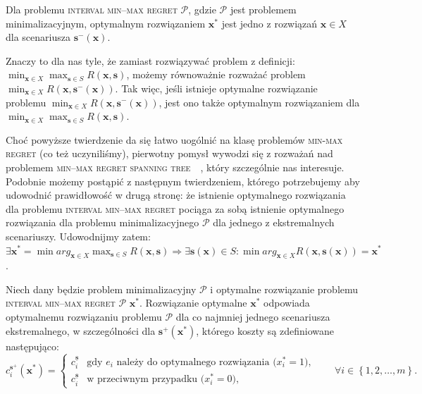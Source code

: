 \begin{corollary}
	Dla problemu \textsc{interval min--max regret $\mathcal{P}$}, gdzie $\mathcal{P}$ jest problemem minimalizacyjnym, optymalnym rozwiązaniem $\textbf{x}^{\ast}$ jest jedno z rozwiązań $\textbf{x} \in X$ dla scenariusza $\textbf{s}^{-} \left( \textbf{x} \right)$.
\end{corollary}

Znaczy to dla nas tyle, że zamiast rozwiązywać problem z definicji: $\min_{\textbf{x} \in X} \max_{\textbf{s} \in S} R \left( \textbf{x}, \textbf{s} \right)$, możemy równoważnie rozważać problem $\min_{\textbf{x} \in X} R \left( \textbf{x}, \textbf{s}^{-} \left( \textbf{x} \right) \right)$. Tak więc, jeśli istnieje optymalne rozwiązanie problemu $\min_{\textbf{x} \in X} R \left( \textbf{x}, \textbf{s}^{-} \left( \textbf{x} \right) \right)$, jest ono także optymalnym rozwiązaniem dla $\min_{\textbf{x} \in X} \max_{\textbf{s} \in S} R \left( \textbf{x}, \textbf{s} \right)$.

Choć powyższe twierdzenie da się łatwo uogólnić na klasę problemów \textsc{min-max regret} (co też uczyniliśmy), pierwotny pomysł wywodzi się z rozważań nad problemem \textsc{min--max regret spanning tree}~\cite[$429$--$430$]{minmaxSurvey}~\cite{robustSTP}, który szczególnie nas interesuje. Podobnie możemy postąpić z następnym twierdzeniem, którego potrzebujemy aby udowodnić prawidłowość w drugą stronę: że istnienie optymalnego rozwiązania dla problemu \textsc{interval min--max regret} pociąga za sobą istnienie optymalnego rozwiązania dla problemu minimalizacyjnego $\mathcal{P}$ dla jednego z ekstremalnych scenariuszy. Udowodnijmy zatem: $\exists \textbf{x}^{\ast} = \min arg_{\textbf{x} \in X} \max_{\textbf{s} \in S} R \left( \textbf{x}, \textbf{s} \right) \Rightarrow \exists \textbf{s} \left( \textbf{x} \right) \in S : \min arg_{\textbf{x} \in X} R \left( \textbf{x}, \textbf{s} \left( \textbf{x} \right) \right) = \textbf{x}^{\ast}$.

\begin{theorem}\label{th:intminmaxreg2}
	Niech dany będzie problem minimalizacyjny $\mathcal{P}$ i optymalne rozwiązanie problemu \textsc{interval min--max regret $\mathcal{P}$} $\textbf{x}^{\ast}$. Rozwiązanie optymalne $\textbf{x}^{\ast}$ odpowiada optymalnemu rozwiązaniu problemu $\mathcal{P}$ dla co najmniej jednego scenariusza ekstremalnego, w szczególności dla $\textbf{s}^{+} \left( \textbf{x}^{\ast} \right)$, którego koszty są zdefiniowane następująco:
	\begin{equation}
		c^{\textbf{s}^{+}}_{i} \left( \textbf{x}^{\ast} \right) = \left\{\begin{matrix}
			c^{\underline{\textbf{s}}}_{i} & \text{gdy $e_{i}$ należy do optymalnego rozwiązania ($x^{\ast}_{i} = 1$),}\\ 
			c^{\underline{\textbf{s}}}_{i} &  \text{w przeciwnym przypadku ($x^{\ast}_{i} = 0$),}
		\end{matrix}\right. \qquad \forall i \in \left\{ 1, 2, \dots, m \right\}\text{.}
	\end{equation}
\end{theorem}

